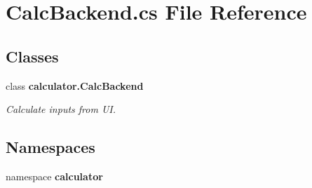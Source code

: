 \section{Calc\+Backend.\+cs File Reference}
\label{_calc_backend_8cs}
\subsection*{Classes}
\begin{DoxyCompactItemize}
\item 
class \textbf{ calculator.\+Calc\+Backend}
\begin{DoxyCompactList}\small\item\em Calculate inputs from UI. \end{DoxyCompactList}\end{DoxyCompactItemize}
\subsection*{Namespaces}
\begin{DoxyCompactItemize}
\item 
namespace \textbf{ calculator}
\end{DoxyCompactItemize}
